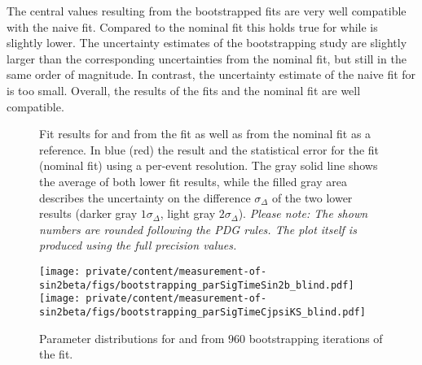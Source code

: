 The central values resulting from the bootstrapped \sPlot fits are very well
compatible with the naive \sPlot fit. Compared to the nominal fit this holds
true for \CJpsiKS while \SJpsiKS is slightly lower. The uncertainty estimates of
the bootstrapping study are slightly larger than the corresponding uncertainties
from the nominal fit, but still in the same order of magnitude. In contrast, the
uncertainty estimate of the naive \sPlot fit for \SJpsiKS is too small. Overall,
the results of the \sPlot fits and the nominal fit are well compatible.
%
\begin{figure}
\centering


\caption{
Fit results for \SJpsiKS and \CJpsiKS from the \sPlot fit as well as from the
nominal fit as a reference. In blue (red) the result and the statistical error
for the \sPlot fit (nominal fit) using a per-event resolution. The gray solid
line shows the average of both lower fit results, while the filled gray area
describes the uncertainty on the difference $\sigma_\Delta$ of the two lower
results (darker gray $1\sigma_\Delta$, light gray $2\sigma_\Delta$).
\textit{Please note: The shown numbers are rounded following the PDG rules. The
plot itself is produced using the full precision values.}}
\label{fig:measurement_of_sin2beta:systematics:cross_checks:splot_fit:s_and_c}
\end{figure}
%
\begin{figure}
\centering
\texttt{[image: private/content/measurement-of-sin2beta/figs/bootstrapping\_parSigTimeSin2b\_blind.pdf]}
\hfill
\texttt{[image: private/content/measurement-of-sin2beta/figs/bootstrapping\_parSigTimeCjpsiKS\_blind.pdf]}
\caption{
Parameter distributions for \SJpsiKS and \CJpsiKS from $\num{960}$
bootstrapping iterations of the \sPlot fit.}
\label{fig:measurement_of_sin2beta:systematics:cross_checks:splot_fit:bootstrapping}
\end{figure}

